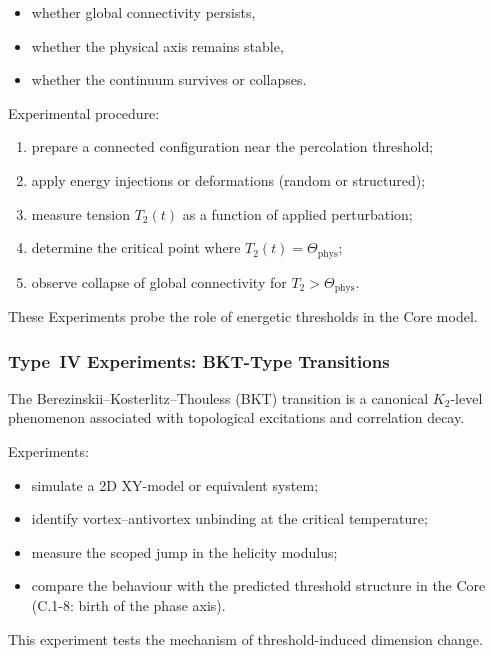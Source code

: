 \begin{itemize}
    \item whether global connectivity persists,
    \item whether the physical axis remains stable,
    \item whether the continuum survives or collapses.
\end{itemize}

Experimental procedure:

\begin{enumerate}
    \item prepare a connected configuration near the percolation threshold;
    \item apply energy injections or deformations (random or structured);
    \item measure tension $T_2(t)$ as a function of applied perturbation;
    \item determine the critical point where $T_2(t) = \Theta_{\mathrm{phys}}$;
    \item observe collapse of global connectivity for $T_2 > \Theta_{\mathrm{phys}}$.
\end{enumerate}

These Experiments probe the role of energetic thresholds in the Core model.



\subsubsection{Type~IV Experiments: BKT-Type Transitions}

The Berezinskii–Kosterlitz–Thouless (BKT) transition is a canonical
$K_2$-level phenomenon associated with topological excitations and
correlation decay.

Experiments:

\begin{itemize}
    \item simulate a 2D XY-model or equivalent system;
    \item identify vortex–antivortex unbinding at the critical temperature;
    \item measure the scoped jump in the helicity modulus;
    \item compare the behaviour with the predicted threshold structure in
          the Core (C.1-8: birth of the phase axis).
\end{itemize}

This experiment tests the mechanism of threshold-induced dimension change.



